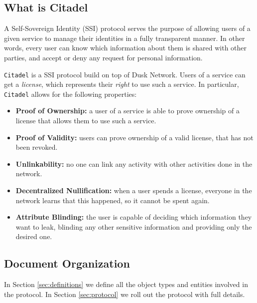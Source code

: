 
\subsection{What is Citadel} 

A Self-Sovereign Identity (SSI) protocol serves the purpose of allowing users of a given service to manage their identities in a fully transparent manner. In other words, every user can know which information about them is shared with other parties, and accept or deny any request for personal information.

\verb!Citadel! is a SSI protocol build on top of Dusk Network. Users of a service can get a \textit{license}, which represents their \textit{right} to use such a service. In particular, \verb!Citadel! allows for the following properties:

\begin{itemize}
	\item \textbf{Proof of Ownership:} a user of a service is able to prove ownership of a license that allows them to use such a service.
	\item \textbf{Proof of Validity:} users can prove ownership of a valid license, that has not been revoked.
 	\item \textbf{Unlinkability:} no one can link any activity with other activities done in the network.
 	\item \textbf{Decentralized Nullification:} when a user spends a license, everyone in the network learns that this happened, so it cannot be spent again.
	\item \textbf{Attribute Blinding:} the user is capable of deciding which information they want to leak, blinding any other sensitive information and providing only the desired one.
\end{itemize}

\subsection{Document Organization} 

In Section \ref{sec:definitions} we define all the object types and entities involved in the protocol. In Section \ref{sec:protocol} we roll out the protocol with full details.
